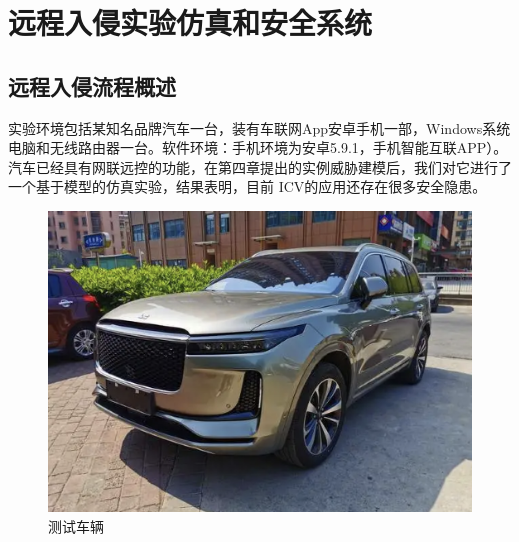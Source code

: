 \chapter{远程入侵实验仿真和安全系统}
\label{ch5}
\section{远程入侵流程概述}
实验环境包括某知名品牌汽车一台，装有车联网App安卓手机一部，Windows系统电脑和无线路由器一台。软件环境：手机环境为安卓5.9.1，手机智能互联APP）。
汽车已经具有网联远控的功能，在第四章提出的实例威胁建模后，我们对它进行了一个基于模型的仿真实验，结果表明，目前 ICV的应用还存在很多安全隐患。

\begin{figure}
    \centering
    \includegraphics[scale=0.5]{resources/img/i14.png}
    \caption{测试车辆}
  \end{figure}

